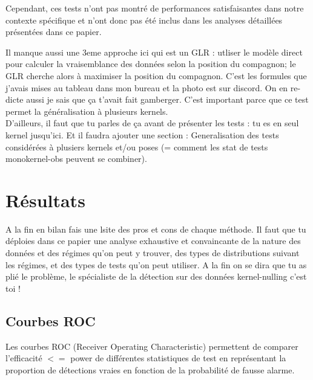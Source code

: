 \documentclass{article}
\newcommand{\dm}[1]{{\color{mulberry} #1}}
\begin{document}
Cependant, ces tests n'ont pas montré de performances satisfaisantes dans notre contexte spécifique et n'ont donc pas été inclus dans les analyses détaillées présentées dans ce papier.



\dm{Il manque aussi une 3eme approche  ici qui est un GLR : utliser le modèle direct pour calculer la vraisemblance des données selon la position du compagnon; le GLR cherche alors à maximiser la position du compagnon. C'est les formules que j'avais mises au tableau dans mon bureau et la photo est sur discord. On en re-dicte aussi je sais que ça t'avait fait gamberger. C'est important parce que ce test permet la généralisation à plusieurs kernels. \\
D'ailleurs, il faut que tu parles de ça avant de présenter les tests : tu es en seul kernel jusqu'ici. Et il faudra ajouter  une section : Generalisation des tests considérées à plusiers kernels et/ou poses (= comment les stat de tests monokernel-obs peuvent se combiner).}


\section{Résultats}

\dm{A la fin en bilan fais une lsite des pros et cons de chaque méthode. Il faut que tu déploies dans ce papier une analyse exhaustive et convaincante de la nature des données et des régimes qu'on peut y trouver, des types de distributions suivant les régimes, et des types de tests qu'on peut utiliser. A la fin on se dira que tu as plié le problème, le spécialiste de la détection sur des données kernel-nulling c'est toi !  }
\subsection{Courbes ROC}

Les courbes ROC (Receiver Operating Characteristic) permettent de comparer l'efficacité \dm{$<=$ power } de différentes statistiques de test en représentant la proportion de détections vraies en fonction de la probabilité de fausse alarme.
\end{document}
